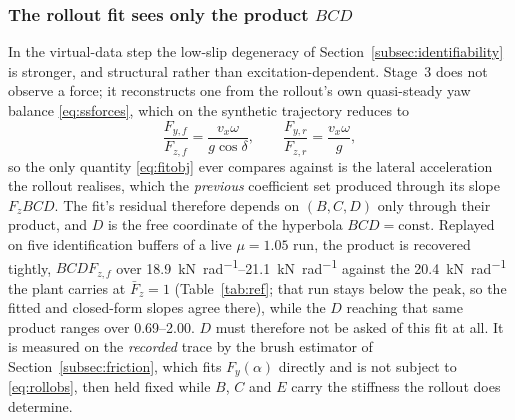 \subsubsection{The rollout fit sees only the product $BCD$}
\label{subsec:bcd}
In the virtual-data step the low-slip degeneracy of
Section~\ref{subsec:identifiability} is stronger, and structural rather than
excitation-dependent. Stage~3 does not observe a force; it reconstructs one from
the rollout's own quasi-steady yaw balance \eqref{eq:ssforces}, which on the
synthetic trajectory reduces to
\begin{equation}
\frac{F_{y,f}}{F_{z,f}}=\frac{v_{x}\omega}{g\cos\delta},\qquad
\frac{F_{y,r}}{F_{z,r}}=\frac{v_{x}\omega}{g},
\label{eq:rollobs}
\end{equation}
so the only quantity \eqref{eq:fitobj} ever compares against is the lateral
acceleration the rollout realises, which the \emph{previous} coefficient set
produced through its slope $F_{z}BCD$. The fit's residual therefore
depends on $(B,C,D)$ only through their product, and $D$ is the free coordinate
of the hyperbola $BCD=\mathrm{const}$. Replayed on five identification buffers
of a live $\mu=\num{1.05}$ run, the product is recovered tightly, $BCDF_{z,f}$
over \SIrange{18.9}{21.1}{\kilo\newton\per\radian} against the
\SI{20.4}{\kilo\newton\per\radian} the plant carries at $\bar F_{z}=1$
(Table~\ref{tab:ref}; that run stays below the peak, so the fitted and
closed-form slopes agree there), while the $D$ reaching that same product
ranges over \numrange{0.69}{2.00}. $D$ must therefore not be asked of this fit
at all. It is measured on the \emph{recorded} trace by the brush estimator of
Section~\ref{subsec:friction}, which fits $F_{y}(\alpha)$ directly and is not
subject to \eqref{eq:rollobs}, then held fixed while $B$, $C$ and $E$ carry the
stiffness the rollout does determine.

